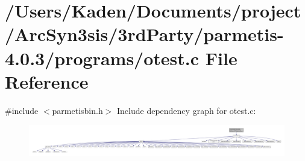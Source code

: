 \hypertarget{a00428}{}\section{/\+Users/\+Kaden/\+Documents/project/\+Arc\+Syn3sis/3rd\+Party/parmetis-\/4.0.3/programs/otest.c File Reference}
\label{a00428}
{\ttfamily \#include $<$parmetisbin.\+h$>$}\newline
Include dependency graph for otest.\+c\+:\nopagebreak
\begin{figure}[H]
\begin{center}
\leavevmode
\includegraphics[width=350pt]{a00429}
\end{center}
\end{figure}
